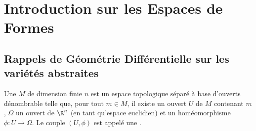 \section{Introduction sur les Espaces de Formes}
\subsection{Rappels de Géométrie Différentielle sur les variétés abstraites}

\begin{definition}
	Une  $M$ de dimension finie $n$ est un espace topologique séparé à base
	d'ouverts dénombrable telle que, pour tout $m \in M$, il existe un ouvert $U$ de $M$ contenant $m$,
	$\Omega$ un ouvert de $\R^{n}$ (en tant qu'espace euclidien) et un homéomorphisme $\phi: U \to \Omega$.
	Le couple $(U, \phi)$ est appelé une .
\end{definition}

